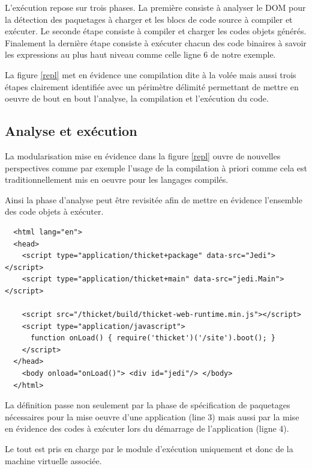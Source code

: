 \documentclass[twoside,a4paper]{article}
\begin{document}
L'exécution repose sur  trois phases. La première  consiste à analyser
le DOM pour la détection des paquetages à charger et les blocs de code
source à compiler et exécuter. Le seconde étape consiste à compiler et
charger  les  codes  objets  générés.  Finalement  la  dernière  étape
consiste à exécuter chacun des  code binaires à savoir les expressions
au  plus haut  niveau comme  celle ligne  6 de  notre exemple.  

La figure \ref{repl}  met en évidence une compilation dite  à la volée
mais  aussi  trois  étapes  clairement identifiée  avec  un  périmètre
délimité permettant de mettre en oeuvre  de bout en bout l'analyse, la
compilation  et l'exécution  du  code. 

\subsection{Analyse et exécution}

La modularisation mise en évidence  dans la figure \ref{repl} ouvre de
nouvelles perspectives comme  par exemple l'usage de  la compilation à
priori  comme  cela est  traditionnellement  mis  en oeuvre  pour  les
langages compilés.

Ainsi  la  phase d'analyse  peut  être  revisitée  afin de  mettre  en
évidence l'ensemble des code objets à exécuter.

\lstset{language=Html}
\begin{lstlisting}
  <html lang="en">
  <head>
    <script type="application/thicket+package" data-src="Jedi"></script>
    <script type="application/thicket+main" data-src="jedi.Main"></script>

    <script src="/thicket/build/thicket-web-runtime.min.js"></script>    
    <script type="application/javascript">
      function onLoad() { require('thicket')('/site').boot(); }
    </script>
  </head>        
    <body onload="onLoad()"> <div id="jedi"/> </body>
  </html>
\end{lstlisting}

La définition  passe non  seulement par la  phase de  spécification de
paquetages nécessaires pour la mise  oeuvre d'une application (line 3)
mais  aussi par  la mise  en  évidence des  codes à  exécuter lors  du
démarrage de l'application (ligne 4).

Le tout  est pris en  charge par  le module d'exécution  uniquement et
donc de la machine virtuelle associée.
\end{document}
